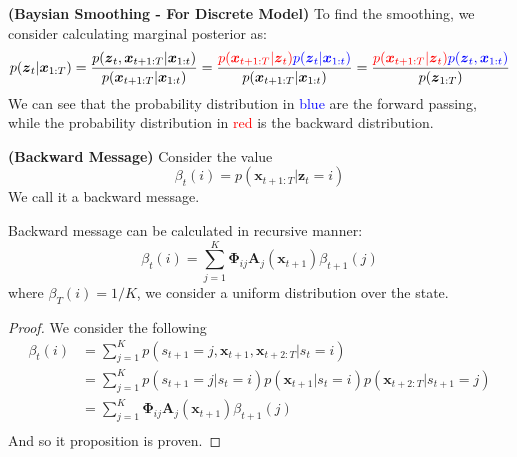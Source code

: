\begin{remark}{\textbf{(Baysian Smoothing - For Discrete Model)}}
    To find the smoothing, we consider calculating marginal posterior as:
    \begin{equation*}
        p(\boldsymbol z_t | \boldsymbol x_{1:T}) = \frac{p(\boldsymbol z_t, \boldsymbol x_{t+1:T} | \boldsymbol x_{1:t})}{p(\boldsymbol x_{t+1:T} | \boldsymbol x_{1:t})} 
        = \frac{\textcolor{red}{p(\boldsymbol x_{t+1:T} | \boldsymbol z_t)}\textcolor{blue}{p(\boldsymbol z_t|\boldsymbol x_{1:t})}}{p(\boldsymbol x_{t+1:T} | \boldsymbol x_{1:t})} 
        = \frac{\textcolor{red}{p(\boldsymbol x_{t+1:T} | \boldsymbol z_t)}\textcolor{blue}{p(\boldsymbol z_t, \boldsymbol x_{1:t})}}{p(\boldsymbol z_{1:T})}
    \end{equation*}
    We can see that the probability distribution in \textcolor{blue}{blue} are the forward passing, while the probability distribution in \textcolor{red}{red} is the backward distribution.
\end{remark}

\begin{definition}{\textbf{(Backward Message)}}
    Consider the value 
    \begin{equation*} 
        \beta_t(i) = p(\boldsymbol x_{t+1:T} | \boldsymbol z_t = i)
    \end{equation*} 
    We call it a backward message. 
\end{definition}

\begin{proposition}
    Backward message can be calculated in recursive manner:
    \begin{equation*}
        \beta_t(i) = \sum^K_{j=1} \boldsymbol \Phi_{ij}\boldsymbol A_j(\boldsymbol x_{t+1})\beta_{t+1}(j)
    \end{equation*}
    where $\beta_T(i) = 1/K$, we consider a uniform distribution over the state.
\end{proposition}
\begin{proof}
    We consider the following
    \begin{equation*}
    \begin{aligned}
        \beta_t(i) 
        &= \sum^K_{j=1} p(s_{t+1} = j, \boldsymbol x_{t+1}, \boldsymbol x_{t+2:T} | s_t = i) \\
        &= \sum^K_{j=1} p(s_{t+1} = j | s_t = i) p(\boldsymbol x_{t+1} | s_t = i)p(\boldsymbol x_{t+2:T} | s_{t+1} = j) \\
        &= \sum^K_{j=1} \boldsymbol \Phi_{ij}\boldsymbol A_j(\boldsymbol x_{t+1})\beta_{t+1}(j) \\
    \end{aligned}
    \end{equation*}
    And so it proposition is proven.
\end{proof}


